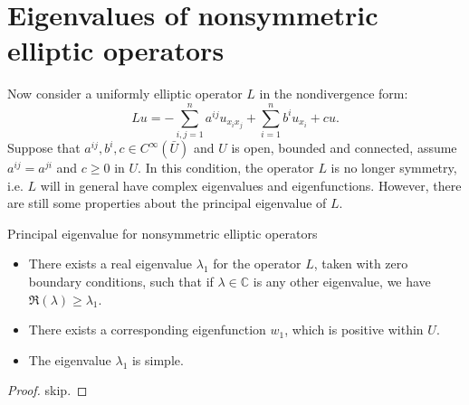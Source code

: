 \section{Eigenvalues of nonsymmetric elliptic operators}
Now consider a uniformly elliptic operator $L$ in the nondivergence form:
\begin{equation}
    Lu=-\sum_{i,j=1}^{n}a^{ij}u_{x_{i}x_{j}}+\sum_{i=1}^{n}b^{i}u_{x_{i}}+cu.
\end{equation}
Suppose that $a^{ij},b^{i},c\in C^{\infty}(\bar{U})$ and $U$ is open, bounded and connected, assume $a^{ij}=a^{ji}$ and $c\ge 0$ in $U$. In this condition, the operator $L$ is no longer symmetry, i.e. $L$ will in general have complex eigenvalues and eigenfunctions. However, there are still some properties about the principal eigenvalue of $L$.
\begin{theorem}{Principal eigenvalue for nonsymmetric elliptic operators}
    \begin{itemize}
        \item There exists a real eigenvalue $\lambda_{1}$ for the operator $L$, taken with zero boundary conditions, such that if $\lambda\in\mathbb{C}$ is any other eigenvalue, we have $\Re(\lambda)\ge\lambda_{1}$.
        \item There exists a corresponding eigenfunction $w_{1}$, which is positive within $U$.
        \item The eigenvalue $\lambda_{1}$ is simple.
    \end{itemize}
\end{theorem}
\begin{proof}
    skip.
\end{proof}

